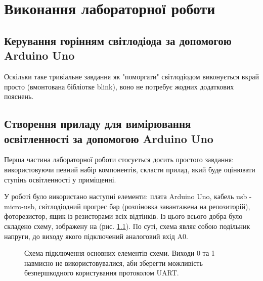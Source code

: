 \chapter{Виконання лабораторної роботи} 
\label{chapter:first}

\section{Керування горінням світлодіода за допомогою Arduino Uno}

Оскільки таке тривіальне завдання як "поморгати" світлодіодом виконується вкрай просто (вмонтована бібліотке blink), воно не потребує жодних додаткових пояснень.

\section{Створення приладу для вимірювання освітленності за допомогою Arduino Uno}

Перша частина лабораторної роботи стосується досить простого завдання: використовуючи певний набір компонентів, скласти прилад, який буде оцінювати ступінь освітленності у приміщенні.

У роботі було використано наступні елементи: плата Arduino Uno, кабель usb - micro-usb, світлодіодний прогрес бар (розпіновка завантажена на репозиторій), фоторезистор, ящик із резисторами всіх відтінків. Із цього всього добра було складено схему, зображену на (рис. \ref{fig:shema1}). По суті, схема являє собою подільник напруги, до виходу якого підключений аналоговий вхід A0.

\begin{figure}[h]
\caption{Схема підключення основних елементів схеми. Виходи 0 та 1 навмисно не використовувалися, аби зберегти можливість безпершкодного користування протоколом UART.}
\label{fig:shema1}
\end{figure}

